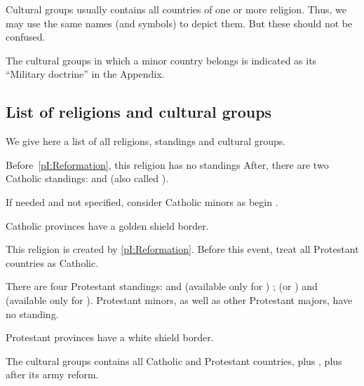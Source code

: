 \aparag Cultural groups usually contains all countries of one or more
religion. Thus, we may use the same names (and symbols) to depict them. But
these should not be confused.

\aparag The cultural groups in which a minor country belongs is indicated as
its ``Military doctrine'' in the Appendix.



\subsection{List of religions and cultural groups}

\label{chThePowers:List of religions}
\aparag We give here a list of all religions, standings and cultural groups.


\aparag Before~\ref{pI:Reformation}, this religion has no standings
\bparag After, there are two Catholic standings:  and
 (also called ).

\bparag If needed and not specified, consider Catholic minors as begin
\CATHCR.

\aparag Catholic provinces have a golden shield border.

\aparag This religion is created by \ref{pI:Reformation}.
\bparag Before this event, treat all Protestant countries as Catholic.

%
\aparag There are four Protestant standings:  and
 (available only for \ANG) ;  (or
) and  (available only for \SUE).
\bparag Protestant minors, as well as other Protestant majors, have no
standing.

\aparag Protestant provinces have a white shield border.

\aparag The  cultural groups contains all Catholic and Protestant
countries, plus \POL, plus \RUS after its army reform.


